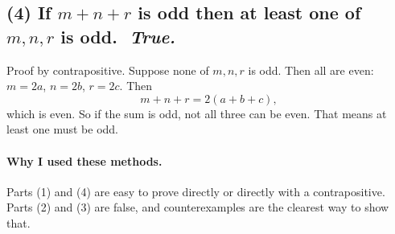\documentclass[11pt]{article}
\begin{document}
\subsection*{(4) If $m+n+r$ is odd then at least one of $m,n,r$ is odd. \,\,\textit{True.}}
Proof by contrapositive. Suppose none of $m,n,r$ is odd. Then all are even: $m=2a$, $n=2b$, $r=2c$. Then
\[
m+n+r = 2(a+b+c),
\]
which is even. So if the sum is odd, not all three can be even. That means at least one must be odd.

\paragraph{Why I used these methods.}
Parts (1) and (4) are easy to prove directly or directly with a contrapositive. Parts (2) and (3) are false, and counterexamples are the clearest way to show that.
\end{document}
